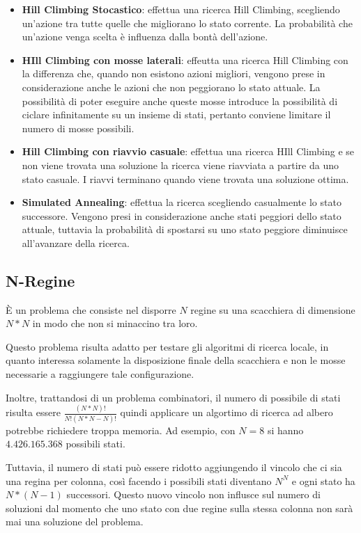\begin{itemize}
\item \textbf{Hill Climbing Stocastico}: effettua una ricerca Hill Climbing, scegliendo un'azione tra tutte quelle che migliorano lo stato corrente. La probabilità che un'azione venga scelta è influenza dalla bontà dell'azione.
\item \textbf{HIll Climbing con mosse laterali}: effeutta una ricerca Hill Climbing con la differenza che, quando non esistono azioni migliori, vengono prese in considerazione anche le azioni che non peggiorano lo stato attuale. La possibilità di poter eseguire anche queste mosse introduce la possibilità di ciclare infinitamente su un insieme di stati, pertanto conviene limitare il numero di mosse possibili.
\item \textbf{Hill Climbing con riavvio casuale}: effettua una ricerca HIll Climbing e se non viene trovata una soluzione la ricerca viene riavviata a partire da uno stato casuale. I riavvi terminano quando viene trovata una soluzione ottima.
\item \textbf{Simulated Annealing}: effettua la ricerca scegliendo casualmente lo stato successore. Vengono presi in considerazione anche stati peggiori dello stato attuale, tuttavia la probabilità di spostarsi su uno stato peggiore diminuisce all'avanzare della ricerca.
\end{itemize}

\subsection{N-Regine}

\`{E} un problema che consiste nel disporre $N$ regine su una scacchiera di dimensione $N * N$ in modo che non si minaccino tra loro.

Questo problema risulta adatto per testare gli algoritmi di ricerca locale, in quanto interessa solamente la disposizione finale della scacchiera e non le mosse necessarie a raggiungere tale configurazione.

Inoltre, trattandosi di un problema combinatori, il numero di possibile di stati risulta essere $\frac{(N*N)!}{N! (N*N - N)!}$ quindi applicare un algortimo di ricerca ad albero potrebbe richiedere troppa memoria. Ad esempio, con $N=8$ si hanno $4.426.165.368$ possibili stati.

Tuttavia, il numero di stati può essere ridotto aggiungendo il vincolo che ci sia una regina per colonna, così facendo i possibili stati diventano $N^N$ e ogni stato ha $N * (N-1)$ successori.
Questo nuovo vincolo non influsce sul numero di soluzioni dal momento che uno stato con due regine sulla stessa colonna non sarà mai una soluzione del problema.


